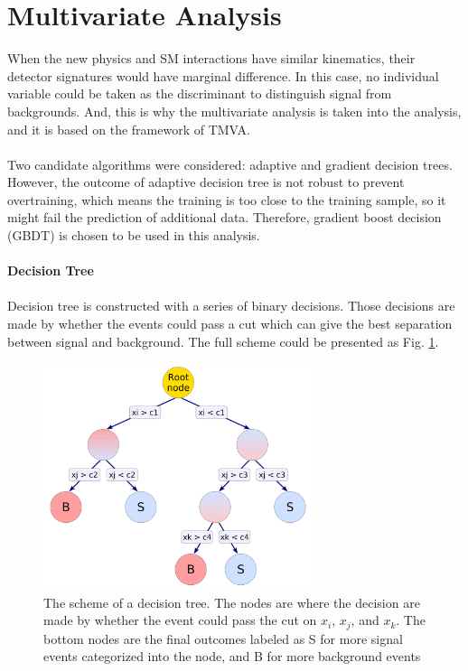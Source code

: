\section{Multivariate Analysis}
When the new physics and SM interactions have similar kinematics, their detector signatures would have marginal difference. In this case, no individual variable could be taken as the discriminant to distinguish signal from backgrounds. And, this is why the multivariate analysis is taken into the analysis, and it is based on the framework of TMVA\cite{Hocker:2007ht}.
\\
\\Two candidate algorithms were considered: adaptive and gradient decision trees. However, the outcome of adaptive decision tree is not robust to prevent overtraining\cite{Aad:2019xxo}, which means the training is too close to the training sample, so it might fail the prediction of additional data. Therefore, gradient boost decision (GBDT) is chosen to be used in this analysis.
\\
\\{\bf Decision Tree}
\\
\\Decision tree is constructed with a series of binary decisions. Those decisions are made by whether the events could pass a cut which can give the best separation between signal and background. The full scheme could be presented as Fig. \ref{Fig:decision_tree}.
\begin{figure}[tbp]
	\begin{center}
		\includegraphics[width=0.7\textwidth,keepaspectratio]{Chapter5/DT.png}
		\caption{The scheme of a decision tree. The nodes are where the decision are made by whether the event could pass the cut on $x_i$, $x_j$, and $x_k$. The bottom nodes are the final outcomes labeled as S for more signal events categorized into the node, and B for more background events}
		\label{Fig:decision_tree}
	\end{center}
\end{figure} 
